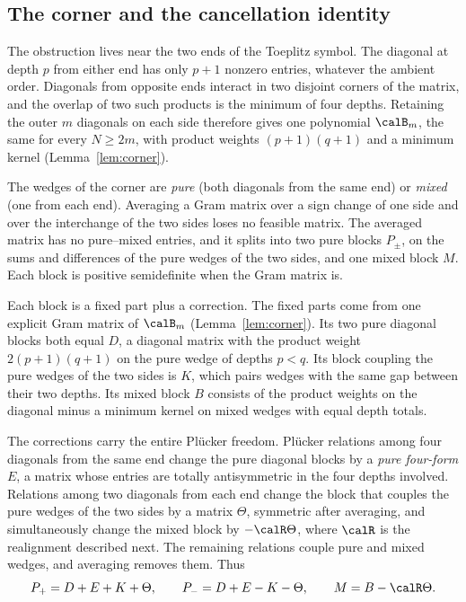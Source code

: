 \subsection{The corner and the cancellation identity}\label{sec:mech-identity}
The obstruction lives near the two ends of the Toeplitz symbol. The
diagonal at depth $p$ from either end has only $p+1$ nonzero entries,
whatever the ambient order. Diagonals from opposite ends interact in two
disjoint corners of the matrix, and the overlap of two such products is
the minimum of four depths. Retaining the outer $m$ diagonals on each
side therefore gives one polynomial $\calB_m$, the same for every
$N\ge2m$, with product weights $(p+1)(q+1)$ and a minimum kernel
(Lemma~\ref{lem:corner}).

The wedges of the corner are \emph{pure} (both diagonals from the same
end) or \emph{mixed} (one from each end). Averaging a Gram matrix over a
sign change of one side and over the interchange of the two sides loses
no feasible matrix. The averaged matrix has no pure--mixed entries, and
it splits into two pure blocks $P_\pm$, on the sums and differences of
the pure wedges of the two sides, and one mixed block $M$. Each block is
positive semidefinite when the Gram matrix is.

Each block is a fixed part plus a correction. The fixed parts come from
one explicit Gram matrix of $\calB_m$ (Lemma~\ref{lem:corner}). Its two
pure diagonal blocks both equal $D$, a diagonal matrix with the product
weight $2(p+1)(q+1)$ on the pure wedge of depths $p<q$. Its block
coupling the pure wedges of the two sides is $K$, which pairs wedges
with the same gap between their two depths. Its mixed block $B$ consists
of the product weights on the diagonal minus a minimum kernel on mixed
wedges with equal depth totals.

The corrections carry the entire Pl\"ucker freedom. Pl\"ucker relations
among four diagonals from the same end change the pure diagonal blocks
by a \emph{pure four-form} $E$, a matrix whose entries are totally
antisymmetric in the four depths involved. Relations among two
diagonals from each end change the block that couples the pure wedges of
the two sides by a matrix $\Theta$, symmetric after averaging, and
simultaneously change the mixed block by $-\calR\Theta$, where $\calR$
is the realignment described next. The remaining relations couple pure
and mixed wedges, and averaging removes them. Thus
\[
 P_+=D+E+K+\Theta,\qquad P_-=D+E-K-\Theta,\qquad M=B-\calR \Theta.
\]

